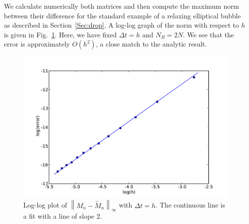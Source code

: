 \documentclass[preprint,12pt]{elsarticle}
\newcommand{\norm}[1]{\left\lVert#1\right\rVert}
\begin{document}
 We calculate numerically both matrices and then compute the maximum norm between their difference for the standard example of
 a relaxing elliptical bubble as described in Section~\ref{Sec:drop}. A log-log graph of the norm with respect to $h$ is given in 
 Fig.~\ref{fig:loglog15}. Here, we have fixed $\Delta t = h$ and $N_B=2N$. We see that the error is approximately $O(h^2)$, a close match to the analytic result.

\begin{figure}[!b]
  \begin{center}
    \includegraphics[bb=0in 0in 7.7in 6.3in,width=4.8in,clip]{matrixerror.pdf}
  \end{center}
  \caption{\small Log-log plot of $\norm{M_n-\tilde{M}_n}_\infty$ with $\Delta t = h$. The continuous line is a fit with a line of slope 2.}
  \label{fig:loglog15}
\end{figure}
\end{document}
